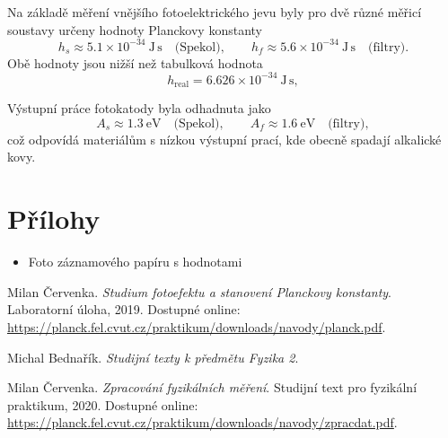 \documentclass[a4paper,12pt]{article}
\begin{document}
Na základě měření vnějšího fotoelektrického jevu byly pro dvě různé
měřicí soustavy určeny hodnoty Planckovy konstanty
\[
h_s \approx 5.1\times 10^{-34}\ \mathrm{J\,s} \quad\text{(Spekol)},\qquad
h_f \approx 5.6\times 10^{-34}\ \mathrm{J\,s} \quad\text{(filtry)}.
\]
Obě hodnoty jsou nižší než tabulková hodnota
\[
h_\mathrm{real} = 6.626\times 10^{-34}\ \mathrm{J\,s},
\]

Výstupní práce fotokatody byla odhadnuta jako
\[
A_s \approx 1.3\ \mathrm{eV} \quad\text{(Spekol)},\qquad
A_f \approx 1.6\ \mathrm{eV} \quad\text{(filtry)},
\]
což odpovídá materiálům s nízkou výstupní prací, kde obecně spadají alkalické kovy.

\newpage
\section{Přílohy}
\begin{itemize}
    \item Foto záznamového papíru s hodnotami
\end{itemize}

\begin{thebibliography}{}

    Milan Červenka. \textit{Studium fotoefektu a stanovení Planckovy konstanty}. Laboratorní úloha, 2019. Dostupné online: \url{https://planck.fel.cvut.cz/praktikum/downloads/navody/planck.pdf}.

    Michal Bednařík. \textit{Studijní texty k předmětu Fyzika 2}.
    
    Milan Červenka. \textit{Zpracování fyzikálních měření}. Studijní text pro fyzikální praktikum, 2020. Dostupné online: \url{https://planck.fel.cvut.cz/praktikum/downloads/navody/zpracdat.pdf}.

\end{thebibliography}
\end{document}
